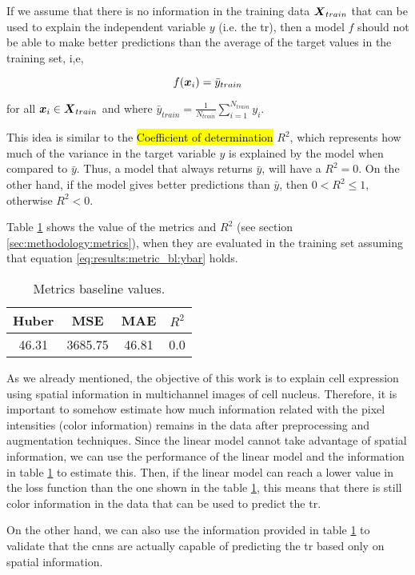 

\graphicspath{{./Sections/Results/Resources/}}

If we assume that there is no information in the training data $\boldsymbol{X}_{train}$ that can be used to explain the independent variable $y$ (i.e. the \gls{tr}), then a model $f$ should not be able to make better predictions than the average of the target values in the training set, i,e,

\begin{equation}
  f(\boldsymbol{x}_i)=\bar{y}_{train}
  \label{eq:results:metric_bl:ybar}
\end{equation}

\noindent for all $\boldsymbol{x}_i \in \boldsymbol{X}_{train}$ and where $\bar{y}_{train}=\frac{1}{N_{train}}\sum_{i=1}^{N_{train}}y_i$.

This idea is similar to the \hl{Coefficient of determination} $R^2$, which represents how much of the variance in the target variable $y$ is explained by the model when compared to $\bar{y}$.
Thus, a model that always returns $\bar{y}$, will have a $R^2=0$. On the other hand, if the model gives better predictions than $\bar{y}$, then $0 < R^2 \leq 1$, otherwise $R^2 < 0$.

Table \ref{table:results:metric_bl_vals} shows the value of the metrics and $R^2$ (see section \ref{sec:methodology:metrics}), when they are evaluated in the training set assuming that equation \ref{eq:results:metric_bl:ybar} holds.

\begin{table}[!ht]
  \centering
  \begin{tabular}{c|c|c|c}
    \hline
    Huber & MSE & MAE & $R^2$ \\
    \hline
    46.31 & 3685.75 & 46.81 & 0.0 \\
    \hline
  \end{tabular}
  \caption{Metrics baseline values.}
  \label{table:results:metric_bl_vals}
\end{table}

As we already mentioned, the objective of this work is to explain cell expression using spatial information in multichannel images of cell nucleus.
Therefore, it is important to somehow estimate how much information related with the pixel intensities (color information) remains in the data after preprocessing and augmentation techniques.
Since the linear model cannot take advantage of spatial information, we can use the performance of the linear model and the information in table \ref{table:results:metric_bl_vals} to estimate this.
Then, if the linear model can reach a lower value in the loss function than the one shown in the table \ref{table:results:metric_bl_vals}, this means that there is still color information in the data that can be used to predict the \gls{tr}.

On the other hand, we can also use the information provided in table \ref{table:results:metric_bl_vals} to validate that the \glspl{cnn} are actually capable of predicting the \gls{tr} based only on spatial information.
